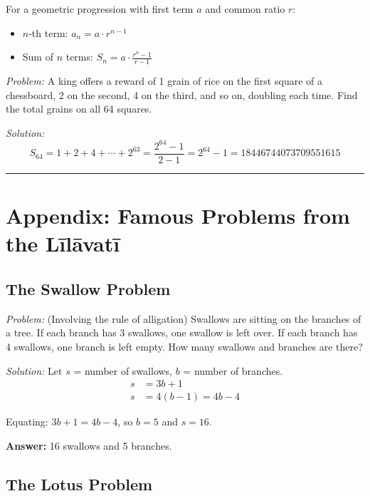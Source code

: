 \documentclass[11pt,a4paper]{book}
\newcommand{\longline}{\noindent\rule{\textwidth}{0.4pt}}
\begin{document}
For a geometric progression with first term $a$ and common ratio $r$:

\begin{itemize}
\item $n$-th term: $a_n = a \cdot r^{n-1}$
\item Sum of $n$ terms: $S_n = a \cdot \frac{r^n - 1}{r - 1}$
\end{itemize}

\textit{Problem:} A king offers a reward of 1 grain of rice on the first square of a chessboard, 2 on the second, 4 on the third, and so on, doubling each time. Find the total grains on all 64 squares.

\textit{Solution:}
\[
S_{64} = 1 + 2 + 4 + \cdots + 2^{63} = \frac{2^{64} - 1}{2 - 1} = 2^{64} - 1 = 18446744073709551615
\]

\longline

\chapter*{Appendix: Famous Problems from the Līlāvatī}

\section*{The Swallow Problem}

\textit{Problem:} (Involving the rule of alligation) Swallows are sitting on the branches of a tree. If each branch has 3 swallows, one swallow is left over. If each branch has 4 swallows, one branch is left empty. How many swallows and branches are there?

\textit{Solution:} Let $s$ = number of swallows, $b$ = number of branches.
\begin{align*}
s &= 3b + 1 \\
s &= 4(b-1) = 4b - 4
\end{align*}

Equating: $3b + 1 = 4b - 4$, so $b = 5$ and $s = 16$.

\textbf{Answer:} 16 swallows and 5 branches.

\section*{The Lotus Problem}
\end{document}
